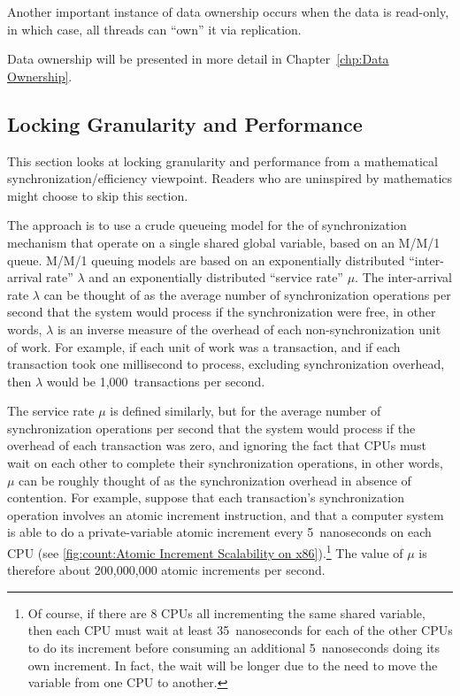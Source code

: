 Another important instance of data ownership occurs when the data
is read-only, in which case,
all threads can ``own'' it via replication.

Data ownership will be presented in more detail in
Chapter~\ref{chp:Data Ownership}.

\subsection{Locking Granularity and Performance}
\label{sec:SMPdesign:Locking Granularity and Performance}

This section looks at locking granularity and performance from
a mathematical synchronization\-/efficiency viewpoint.
Readers who are uninspired by mathematics might choose to skip
this section.

The approach is to use a crude queueing model for the  of
synchronization mechanism that operate on a single shared global
variable, based on an M/M/1 queue.
M/M/1 queuing models are based on an exponentially distributed
``inter-arrival rate'' $\lambda$ and an exponentially distributed
``service rate'' $\mu$.
The inter-arrival rate $\lambda$ can be thought of as the average
number of synchronization operations per second that the system
would process if the synchronization were free, in other words,
$\lambda$ is an inverse measure of the overhead of each non-synchronization
unit of work.
For example, if each unit of work was a transaction, and if each transaction
took one millisecond to process, excluding synchronization overhead,
then $\lambda$ would be 1,000~transactions per second.

The service rate $\mu$ is defined similarly, but for the average
number of synchronization operations per second that the system
would process if the overhead of each transaction was zero, and
ignoring the fact that CPUs must wait on each other to complete
their synchronization operations, in other words, $\mu$ can be roughly
thought of as the synchronization overhead in absence of contention.
For example, suppose that each transaction's synchronization operation
involves an atomic increment instruction, and that a computer system is
able to do a private-variable atomic increment every 5~nanoseconds on
each CPU
(see \cref{fig:count:Atomic Increment Scalability on x86}).\footnote{
	Of course, if there are 8 CPUs all incrementing the same
	shared variable, then each CPU must wait at least 35~nanoseconds
	for each of the other CPUs to do its increment before consuming
	an additional 5~nanoseconds doing its own increment.
	In fact, the wait will be longer due to the need
	to move the variable from one CPU to another.}
The value of $\mu$ is therefore about 200,000,000 atomic increments
per second.

